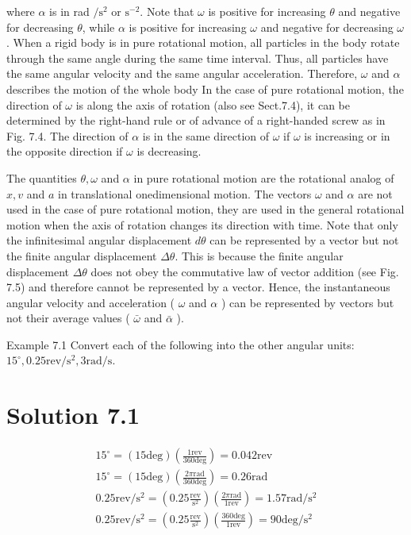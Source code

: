 \documentclass[10pt]{article}
\begin{document}
where $\alpha$ is in rad $/ \mathrm{s}^{2}$ or $\mathrm{s}^{-2}$. Note that $\omega$ is positive for increasing $\theta$ and negative for decreasing $\theta$, while $\alpha$ is positive for increasing $\omega$ and negative for decreasing $\omega$. When a rigid body is in pure rotational motion, all particles in the body rotate through the same angle during the same time interval. Thus, all particles have the same angular velocity and the same angular acceleration. Therefore, $\omega$ and $\alpha$ describes the motion of the whole body In the case of pure rotational motion, the direction of $\omega$ is along the axis of rotation (also see Sect.7.4), it can be determined by the right-hand rule or of advance of a right-handed screw as in Fig. 7.4. The direction of $\alpha$ is in the same direction of $\omega$ if $\omega$ is increasing or in the opposite direction if $\omega$ is decreasing.

The quantities $\theta, \omega$ and $\alpha$ in pure rotational motion are the rotational analog of $x, v$ and $a$ in translational onedimensional motion. The vectors $\omega$ and $\alpha$ are not used in the case of pure rotational motion, they are used in the general rotational motion when the axis of rotation changes its direction with time. Note that only the infinitesimal angular displacement $d \theta$ can be represented by a vector but not the finite angular displacement $\Delta \theta$. This is because the finite angular displacement $\Delta \theta$ does not obey the commutative law of vector addition (see Fig. 7.5) and therefore cannot be represented by a vector. Hence, the instantaneous angular velocity and acceleration ( $\omega$ and $\alpha$ ) can be represented by vectors but not their average values ( $\bar{\omega}$ and $\bar{\alpha}$ ).

Example 7.1 Convert each of the following into the other angular units: $15^{\circ}, 0.25 \mathrm{rev} / \mathrm{s}^{2}, 3 \mathrm{rad} / \mathrm{s}$.

\section*{Solution 7.1}
$$
\begin{gathered}
15^{\circ}=(15 \mathrm{deg})\left(\frac{1 \mathrm{rev}}{360 \mathrm{deg}}\right)=0.042 \mathrm{rev} \\
15^{\circ}=(15 \mathrm{deg})\left(\frac{2 \pi \mathrm{rad}}{360 \mathrm{deg}}\right)=0.26 \mathrm{rad} \\
0.25 \mathrm{rev} / \mathrm{s}^{2}=\left(0.25 \frac{\mathrm{rev}}{\mathrm{s}^{2}}\right)\left(\frac{2 \pi \mathrm{rad}}{1 \mathrm{rev}}\right)=1.57 \mathrm{rad} / \mathrm{s}^{2} \\
0.25 \mathrm{rev} / \mathrm{s}^{2}=\left(0.25 \frac{\mathrm{rev}}{\mathrm{s}^{2}}\right)\left(\frac{360 \mathrm{deg}}{1 \mathrm{rev}}\right)=90 \mathrm{deg} / \mathrm{s}^{2}
\end{gathered}
$$
\end{document}
